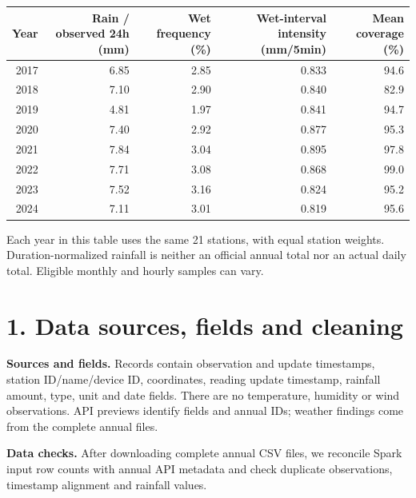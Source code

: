 \documentclass[UTF8,fontset=fandol,10pt,a4paper,landscape]{ctexart}
\begin{document}
\begin{center}\begin{tabular}{rrrrr}
\toprule
Year & Rain / observed 24h (mm) & Wet frequency (\%) & Wet-interval intensity (mm/5min) & Mean coverage (\%)\\\midrule
2017 & 6.85 & 2.85 & 0.833 & 94.6\\
2018 & 7.10 & 2.90 & 0.840 & 82.9\\
2019 & 4.81 & 1.97 & 0.841 & 94.7\\
2020 & 7.40 & 2.92 & 0.877 & 95.3\\
2021 & 7.84 & 3.04 & 0.895 & 97.8\\
2022 & 7.71 & 3.08 & 0.868 & 99.0\\
2023 & 7.52 & 3.16 & 0.824 & 95.2\\
2024 & 7.11 & 3.01 & 0.819 & 95.6\\
\bottomrule\end{tabular}\end{center}
\noindent Each year in this table uses the same 21 stations, with equal station weights. Duration-normalized rainfall is neither an official annual total nor an actual daily total. Eligible monthly and hourly samples can vary.\clearpage\section*{1. Data sources, fields and cleaning}

\textbf{Sources and fields.} Records contain observation and update timestamps, station ID/name/device ID, coordinates, reading update timestamp, rainfall amount, type, unit and date fields. There are no temperature, humidity or wind observations. API previews identify fields and annual IDs; weather findings come from the complete annual files.

\textbf{Data checks.} After downloading complete annual CSV files, we reconcile Spark input row counts with annual API metadata and check duplicate observations, timestamp alignment and rainfall values.
\end{document}
